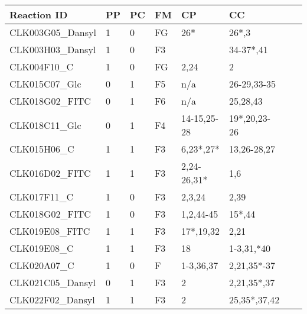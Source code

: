 \begin{table}\centering
    \begin{tabular}{|l|l|l|l|l|l|l|l|}
    \hline
    Reaction ID       & PP & PC & FM & CP & CC \\ \hline
    CLK003G05\_Dansyl & 1                & 0                   & FG             & 26*               & 26*,3  \\ \hline
    CLK003H03\_Dansyl & 1                & 0                   & F3             &                   & 34-37*,41  \\ \hline
    CLK004F10\_C\-2   & 1                & 0                   & FG             & 2,24              & 2        \\ \hline
    CLK015C07\_Glc    & 0                & 1                   & F5             & n/a               & 26-29,33-35  \\ \hline
    CLK018G02\_FITC   & 0                & 1                   & F6             & n/a               & 25,28,43 \\ \hline
    CLK018C11\_Glc    & 0                & 1                   & F4             & 14-15,25-28       & 19*,20,23-26  \\ \hline
    CLK015H06\_C\-2   & 1                & 1                   & F3             & 6,23*,27*         & 13,26-28,27 \\ \hline
    CLK016D02\_FITC   & 1                & 1                   & F3             & 2,24-26,31*       & 1,6 
\\ \hline
    CLK017F11\_C\-3   & 1                & 0                   & F3             & 2,3,24            & 2,39 
\\ \hline
    CLK018G02\_FITC   & 1                & 0                   & F3             & 1,2,44-45         & 15*,44 
\\ \hline
    CLK019E08\_FITC   & 1                & 1                   & F3             & 17*,19,32         & 2,21 
\\ \hline
    CLK019E08\_C\-3   & 1                & 1                   & F3             & 18                & 1-3,31,*40 
\\ \hline
    CLK020A07\_C\-2   & 1                & 0                   & F              & 1-3,36,37         & 2,21,35*-37  \\ \hline
    CLK021C05\_Dansyl & 0                & 1                   & F3             & 2                 & 2,21,35*,37  \\ \hline
    CLK022F02\_Dansyl & 1                & 1                   & F3             & 2                 & 25,35*,37,42  \\ \hline

\end{tabular}
\end{table}
